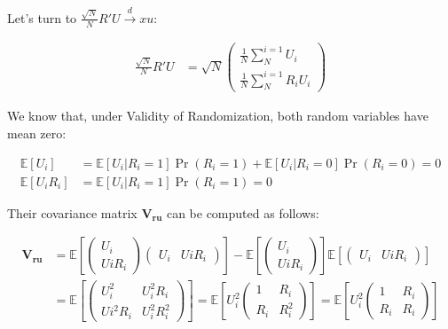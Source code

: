 \documentclass[]{book}
\newcommand{\esp}[1]{\mathbb{E}[ #1 ]}
\theoremstyle{definition}
\theoremstyle{definition}
\theoremstyle{definition}
\theoremstyle{remark}
\begin{document}
Let's turn to \(\frac{\sqrt{N}}{N}R'U\stackrel{d}{\rightarrow}xu\):

\begin{align*}
\frac{\sqrt{N}}{N}R'U & = \sqrt{N}\left(\begin{array}{c}  \frac{1}{N}\sum^{i=1}_{N}U_i\\  \frac{1}{N}\sum^{i=1}_{N}R_iU_i\end{array}\right)
\end{align*}

We know that, under Validity of Randomization, both random variables
have mean zero:

\begin{align*}
\esp{U_i}& = \esp{U_i|R_i=1}\Pr(R_i=1)+\esp{U_i|R_i=0}\Pr(R_i=0)=0 \\
\esp{U_iR_i}& = \esp{U_i|R_i=1}\Pr(R_i=1)=0
\end{align*}

Their covariance matrix \(\mathbf{V_{ru}}\) can be computed as follows:

\begin{align*}
\mathbf{V_{ru}} & = \esp{\left(\begin{array}{c}  U_i\\  UiR_i\end{array}\right)\left(\begin{array}{cc}  U_i&    UiR_i\end{array}\right)}
                  - \esp{\left(\begin{array}{c} U_i\\   UiR_i\end{array}\right)}\esp{\left(\begin{array}{cc}    U_i&    UiR_i\end{array}\right)}\\
                & = \esp{\left(\begin{array}{cc}    U_i^2 & U_i^2R_i\\  Ui^2R_i & U_i^2R_i^2\end{array}\right)} 
                  = \esp{U_i^2\left(\begin{array}{cc}   1 & R_i\\   R_i & R_i^2\end{array}\right)} 
                  = \esp{U_i^2\left(\begin{array}{cc}   1 & R_i\\   R_i & R_i\end{array}\right)} 
\end{align*}
\end{document}
